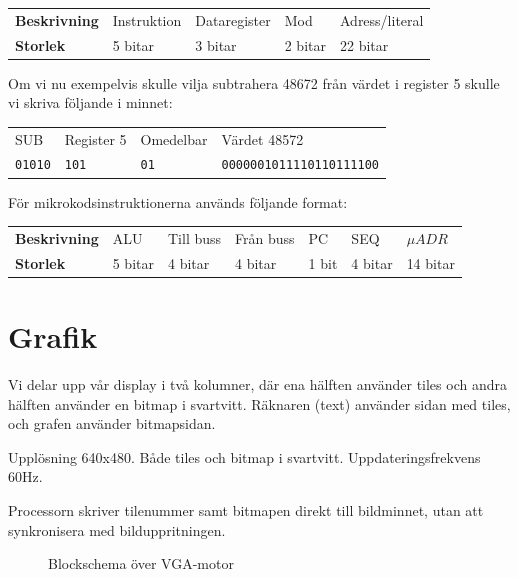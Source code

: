 \documentclass[]{article}
\begin{document}
\bigskip
\begin{tabular}{l|llll}
\textbf{Beskrivning} & Instruktion & Dataregister & Mod & Adress/literal \\
\textbf{Storlek} & 5 bitar & 3 bitar & 2 bitar & 22 bitar \\
\end{tabular}
\bigskip

\noindent
Om vi nu exempelvis skulle vilja subtrahera 48672 från värdet i register 5 skulle vi skriva följande i minnet:

\bigskip
\begin{tabular}{llll}
SUB & Register 5 & Omedelbar & Värdet 48572 \\
\texttt{01010} & \texttt{101} & \texttt{01} &  \texttt{0000001011110110111100}
\end{tabular}
\bigskip

\noindent
För mikrokodsinstruktionerna används följande format:

\bigskip
\begin{tabular}{l|llllll}
	\textbf{Beskrivning} & ALU     & Till buss & Från buss & PC    & SEQ & $\mu ADR $ \\
	\textbf{Storlek}     & 5 bitar & 4 bitar   & 4 bitar   & 1 bit & 4 bitar & 14 bitar
\end{tabular}
\bigskip

\section{Grafik} 
Vi delar upp vår display i två kolumner, där ena hälften använder tiles och andra hälften använder en bitmap i svartvitt. Räknaren (text) använder sidan med tiles, och grafen använder bitmapsidan.

Upplösning 640x480. Både tiles och bitmap i svartvitt. Uppdateringsfrekvens 60Hz.

Processorn skriver tilenummer samt bitmapen direkt till bildminnet, utan att synkronisera med bilduppritningen.

\begin{figure}[h]
	\caption{Blockschema över VGA-motor}
\end{figure}
\end{document}
